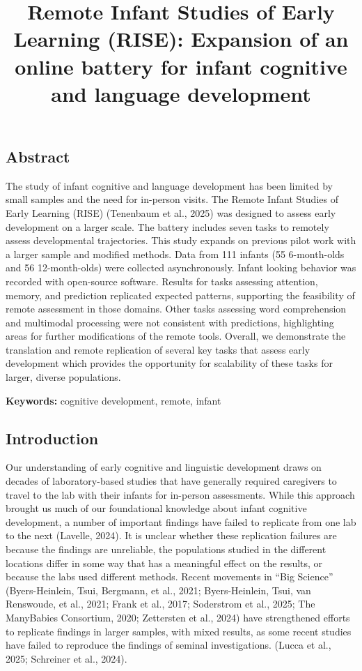 \documentclass[
  english,
  man,floatsintext]{apa6}
\title{Remote Infant Studies of Early Learning (RISE): Expansion of an online battery for infant cognitive and language development}
\author{\phantom{0}}
\date{}
\affiliation{\phantom{0}}
\begin{document}
\maketitle

\subsection{Abstract}\label{abstract}

The study of infant cognitive and language development has been limited by small samples and the need for in-person visits.
The Remote Infant Studies of Early Learning (RISE) (Tenenbaum et al., 2025) was designed to assess early development on a larger scale.
The battery includes seven tasks to remotely assess developmental trajectories.
This study expands on previous pilot work with a larger sample and modified methods.
Data from 111 infants (55 6-month-olds and 56 12-month-olds) were collected asynchronously.
Infant looking behavior was recorded with open-source software.
Results for tasks assessing attention, memory, and prediction replicated expected patterns, supporting the feasibility of remote assessment in those domains.
Other tasks assessing word comprehension and multimodal processing were not consistent with predictions, highlighting areas for further modifications of the remote tools.
Overall, we demonstrate the translation and remote replication of several key tasks that assess early development which provides the opportunity for scalability of these tasks for larger, diverse populations.

\textbf{Keywords:} cognitive development, remote, infant

\newpage

\subsection{Introduction}\label{introduction}

Our understanding of early cognitive and linguistic development draws on decades of laboratory-based studies that have generally required caregivers to travel to the lab with their infants for in-person assessments.
While this approach brought us much of our foundational knowledge about infant cognitive development, a number of important findings have failed to replicate from one lab to the next (Lavelle, 2024).
It is unclear whether these replication failures are because the findings are unreliable, the populations studied in the different locations differ in some way that has a meaningful effect on the results, or because the labs used different methods.
Recent movements in ``Big Science'' (Byers-Heinlein, Tsui, Bergmann, et al., 2021; {Byers-Heinlein, Tsui, van Renswoude, et al.}, 2021; Frank et al., 2017; Soderstrom et al., 2025; The ManyBabies Consortium, 2020; Zettersten et al., 2024) have strengthened efforts to replicate findings in larger samples, with mixed results, as some recent studies have failed to reproduce the findings of seminal investigations.
(Lucca et al., 2025; Schreiner et al., 2024).
\end{document}
